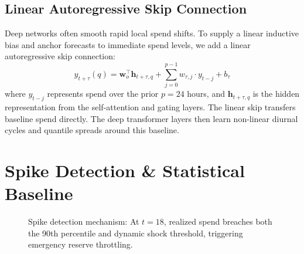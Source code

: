 \documentclass[sigconf]{acmart}
\begin{document}
\subsection{Linear Autoregressive Skip Connection}
Deep networks often smooth rapid local spend shifts. To supply a linear inductive bias and anchor forecasts to immediate spend levels, we add a linear autoregressive skip connection:
\begin{equation}
  \hat{y}_{t+\tau}(q) = \mathbf{w}_o^\top \mathbf{h}_{t+\tau, q} + \sum_{j=0}^{p-1} w_{\tau, j} \cdot y_{t-j} + b_\tau
  \label{eq:ar_skip}
\end{equation}
where $y_{t-j}$ represents spend over the prior $p=24$ hours, and $\mathbf{h}_{t+\tau, q}$ is the hidden representation from the self-attention and gating layers. The linear skip transfers baseline spend directly. The deep transformer layers then learn non-linear diurnal cycles and quantile spreads around this baseline.

\section{Spike Detection \& Statistical Baseline}

\begin{figure}[t]
  \centering
  \caption{Spike detection mechanism: At $t=18$, realized spend breaches both the 90th percentile and dynamic shock threshold, triggering emergency reserve throttling.}
  \label{fig:spike_detection}
\end{figure}
\end{document}

